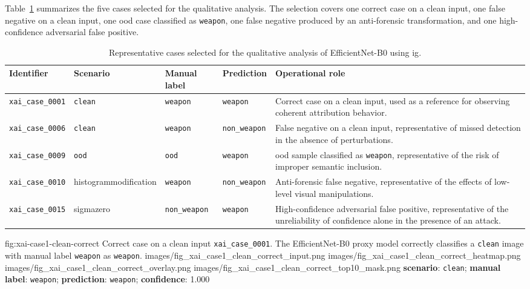 Table~\ref{tab:results-xai-cases} summarizes the five cases selected for the
qualitative analysis. The selection covers one correct case on a clean input,
one false negative on a clean input, one \gls{ood} case classified as
\texttt{weapon}, one false negative produced by an anti-forensic transformation,
and one high-confidence adversarial false positive.

\begin{table}[htbp]
\centering
\small
\renewcommand{\arraystretch}{1.15}
\begin{tabular}{p{} p{} p{} p{} p{}}
\toprule
\textbf{Identifier} &
\textbf{Scenario} &
\textbf{Manual label} &
\textbf{Prediction} &
\textbf{Operational role} \\
\midrule

\texttt{xai\_case\_0001} &
\texttt{clean} &
\texttt{weapon} &
\texttt{weapon} &
Correct case on a clean input, used as a reference for observing coherent
attribution behavior. \\

\texttt{xai\_case\_0006} &
\texttt{clean} &
\texttt{weapon} &
\texttt{non\_weapon} &
False negative on a clean input, representative of missed detection in the
absence of perturbations. \\

\texttt{xai\_case\_0009} &
\texttt{ood} &
\texttt{ood} &
\texttt{weapon} &
\gls{ood} sample classified as \texttt{weapon}, representative of the risk of
improper semantic inclusion. \\

\texttt{xai\_case\_0010} &
\gls{histogrammodification} &
\texttt{weapon} &
\texttt{non\_weapon} &
Anti-forensic false negative, representative of the effects of low-level visual
manipulations. \\

\texttt{xai\_case\_0015} &
\gls{sigmazero} &
\texttt{non\_weapon} &
\texttt{weapon} &
High-confidence adversarial false positive, representative of the unreliability
of confidence alone in the presence of an attack. \\

\bottomrule
\end{tabular}
\caption{Representative cases selected for the qualitative analysis of EfficientNet-B0 using \gls{ig}.}
\label{tab:results-xai-cases}
\end{table}

\XAIcaseFigureMaskGrid
{fig:xai-case1-clean-correct}
{Correct case on a clean input \texttt{xai\_case\_0001}. The EfficientNet-B0
proxy model correctly classifies a \texttt{clean} image with manual label
\texttt{weapon} as \texttt{weapon}.}
{images/fig_xai_case1_clean_correct_input.png}
{images/fig_xai_case1_clean_correct_heatmap.png}
{images/fig_xai_case1_clean_correct_overlay.png}
{images/fig_xai_case1_clean_correct_top10_mask.png}
{\textbf{scenario}: \texttt{clean};
\textbf{manual label}: \texttt{weapon};
\textbf{prediction}: \texttt{weapon};
\textbf{confidence}: 1.000}

